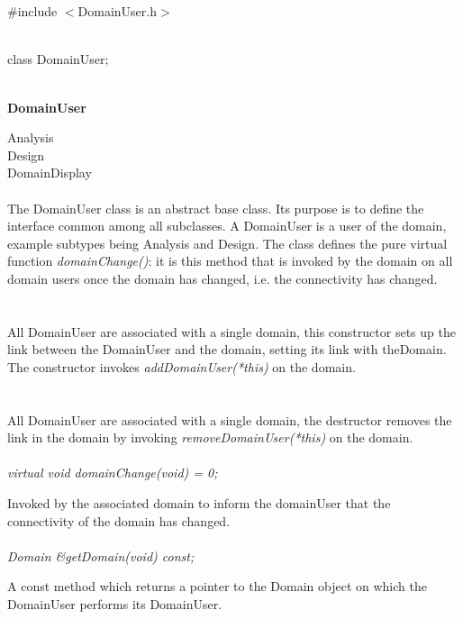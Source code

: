 
 \\

   \\
\#include $<$DomainUser.h$>$  


  \\
class DomainUser;  


 \\
{\bf DomainUser} 

\indent\indent Analysis \\
\indent\indent Design \\
\indent\indent DomainDisplay \\

 \\ 
\indent The DomainUser class is an abstract base class. Its purpose is
to define the interface common among all subclasses.  A DomainUser is
a user of the domain, example subtypes being Analysis and Design. The
class defines the pure virtual function {\em domainChange()}: it is
this method that is invoked by the domain on all domain users once the
domain has changed, i.e. the connectivity has changed. \\

\\ \\ 
All DomainUser are associated with a single domain, this constructor
sets up the link between the DomainUser and the domain, setting its link
with theDomain. The constructor invokes {\em addDomainUser(*this)} on
the domain. \\  

 \\
\\ 
All DomainUser are associated with a single domain, the destructor
removes the link in the domain by invoking {\em removeDomainUser(*this)}
on the domain. \\

\\
{\em virtual void domainChange(void) = 0;} 

Invoked by the associated domain to inform the domainUser that the
connectivity of the domain has changed. \\


  \\
{\em Domain \&getDomain(void) const;} 

A const method which returns a pointer to the Domain object on which
the DomainUser performs its DomainUser.




